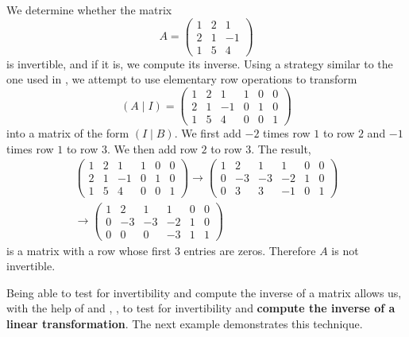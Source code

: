 \begin{example} \label{example 3.2.6}
We determine whether the matrix
\[
    A=\left(\begin{array}{rrr}
        1 & 2 & 1 \\
        2 & 1 & -1 \\
        1 & 5 & 4
    \end{array}\right)
\]
is invertible, and if it is, we compute its inverse.
Using a strategy similar to the one used in , we attempt to use elementary row operations to transform
\[
    (A \mid I) =\left(\begin{array}{rrr|rrr}
        1 & 2 & 1 & 1 & 0 & 0 \\
        2 & 1 & -1 & 0 & 1 & 0 \\
        1 & 5 & 4 & 0 & 0 & 1
    \end{array}\right)
\]
into a matrix of the form \((I \mid B)\).
We first add \(-2\) times row \(1\) to row \(2\) and \(-1\) times row \(1\) to row \(3\).
We then add row \(2\) to row \(3\).
The result,
\[
\begin{aligned}
    \left(\begin{array}{rrr|rrr}
        1 & 2 & 1 & 1 & 0 & 0 \\
        2 & 1 & -1 & 0 & 1 & 0 \\
        1 & 5 & 4 & 0 & 0 & 1
    \end{array}\right)
    \longrightarrow
    \left(\begin{array}{rrr|rrr}
        1 & 2 & 1 & 1 & 0 & 0 \\
        0 & -3 & -3 & -2 & 1 & 0 \\
        0 & 3 & 3 & -1 & 0 & 1
    \end{array}\right) \\
    \longrightarrow
    \left(\begin{array}{rrr|rrr}
        1 & 2 & 1 & 1 & 0 & 0 \\
        0 & -3 & -3 & -2 & 1 & 0 \\
        0 & 0 & 0 & -3 & 1 & 1
    \end{array}\right)
\end{aligned}
\]
is a matrix with a row whose first \(3\) entries are zeros.
Therefore \(A\) is not invertible.
\end{example}

Being able to test for invertibility and compute the inverse of a matrix allows us, with the help of  and , ,
to test for invertibility and \textbf{compute the inverse of a linear transformation}.
The next example demonstrates this technique.

